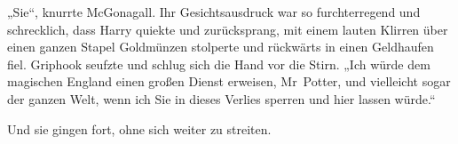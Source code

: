 „Sie“, knurrte McGonagall. Ihr Gesichtsausdruck war so furchterregend und schrecklich, dass Harry quiekte und zurücksprang, mit einem lauten Klirren über einen ganzen Stapel Goldmünzen stolperte und rückwärts in einen Geldhaufen fiel. Griphook seufzte und schlug sich die Hand vor die Stirn. „Ich würde dem magischen England einen großen Dienst erweisen, Mr~Potter, und vielleicht sogar der ganzen Welt, wenn ich Sie in dieses Verlies sperren und hier lassen würde.“

Und sie gingen fort, ohne sich weiter zu streiten.
